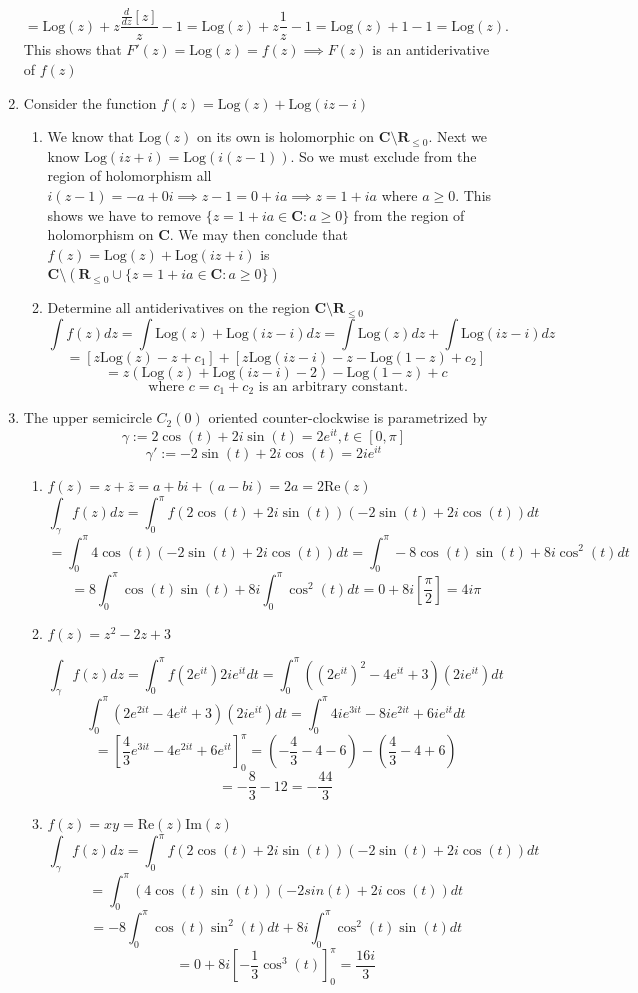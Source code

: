 \documentclass{article}
\newcommand{\R}{\mathbf{R}}
\newcommand{\C}{\mathbf{C}}
\newcommand{\Log}{\text{Log}}
\newcommand{\Real}{\text{Re}}
\newcommand{\Imag}{\text{Im}}
\newcommand{\ddz}{\frac{d}{dz}}
\begin{document}
\begin{enumerate}
	\[=\Log(z)+z\frac{\ddz[z]}{z}-1=\Log(z)+z\frac{1}{z}-1=\Log(z)+1-1=\Log(z). \]
	This shows that $F'(z)=\Log(z)=f(z) \implies F(z)$ is an antiderivative of $f(z)$
	
	\item Consider the function $f(z)=\Log(z)+
	\Log(iz-i)$
	\begin{enumerate}
		\item We know that $\Log(z)$ on its own is holomorphic on $\C\setminus\R_{\leq 0}$. Next we know $\Log(iz+i)=\Log(i(z-1))$. So we must exclude from the region of holomorphism all $i(z-1)=-a+0i \implies z-1 =0+ia \implies z = 1 + ia$ where $a\geq 0$. This shows we have to remove $\{z=1+ia\in\C :  a\geq 0\}$ from the region of holomorphism on $\C$. We may then conclude that $f(z)=\Log(z)+\Log(iz+i)$ is $\C\setminus (\R_{\leq 0} \cup \{z=1+ia\in\C :  a\geq 0\})$
		\item Determine all antiderivatives on the region $\C\setminus\R_{\leq 0}$
		\[\int f(z)dz=\int \Log(z)+\Log(iz-i)dz=\int \Log(z)dz+\int \Log(iz-i)dz\]
		\[ =[z\Log(z)-z+c_1]+[z\Log(iz-i)-z-\Log(1-z)+c_2] \]
		\[=z(\Log(z)+\Log(iz-i)-2)-\Log(1-z)+c \]
		\[\text{ where }c = c_1+c_2 \text{ is an arbitrary constant.}\]
	\end{enumerate}
	
	\item The upper semicircle $C_2(0)$ oriented counter-clockwise is parametrized by 
	$$\gamma := 2\cos(t)+2 i\sin(t)=2e^{it},t\in [0, \pi]$$
	\[\gamma' := -2\sin(t)+2i\cos(t)=2ie^{it} \]
	\begin{enumerate}
		\item $f(z)=z+\overline{z}=a+bi+(a-bi)=2a=2\Real(z)$
		\[ \int_{\gamma} f(z) dz = \int_{0}^{\pi}f(2\cos(t)+2 i\sin(t))(-2\sin(t)+2i\cos(t))dt\]
		\[=\int_{0}^{\pi}4\cos(t)(-2\sin(t)+2i\cos(t)) dt=\int_{0}^{\pi}-8\cos(t)\sin(t)+8i\cos^2(t) dt\]
		\[=8\int_{0}^{\pi}\cos(t)\sin(t)+8i\int_{0}^{\pi}\cos^2(t)dt=0+8i\left[\frac{\pi}{2}\right]=4i\pi\]
		\item $f(z)=z^2-2z+3$
		
		\[ \int_{\gamma} f(z) dz = \int_{0}^{\pi}f(2e^{it})2ie^{it}dt=\int_{0}^{\pi}((2e^{it})^2-4e^{it}+3)(2ie^{it})dt\]
		\[ \int_{0}^{\pi}(2e^{2it}-4e^{it}+3)(2ie^{it})dt=\int_{0}^{\pi}4ie^{3it}-8ie^{2it}+6ie^{it}dt\]
		\[=\left[ \frac{4}{3}e^{3it}-4e^{2it}+6e^{it}  \right]_{0}^{\pi} =\left( -\frac{4}{3}-4-6\right)-\left(\frac{4}{3}-4+6\right)\]
		\[ =-\frac{8}{3}-12=-\frac{44}{3}\]
		
		\item $f(z)=xy=\Real(z)\Imag(z)$
		\[ \int_{\gamma} f(z) dz = \int_{0}^{\pi}f(2\cos(t)+2 i\sin(t))(-2\sin(t)+2i\cos(t))dt\]
		\[=\int_{0}^{\pi}(4\cos(t)\sin(t))(-2sin(t)+2i\cos(t))dt \]
		\[= -8\int_{0}^{\pi}\cos(t)\sin^2(t)dt+8i\int_{0}^{\pi}\cos^2(t)\sin(t)dt \]
		\[=0+8i\left[ -\frac{1}{3}\cos^3(t)\right]_{0}^{\pi}=\frac{16i}{3} \]
		

\end{enumerate}
\end{enumerate}
\end{document}
